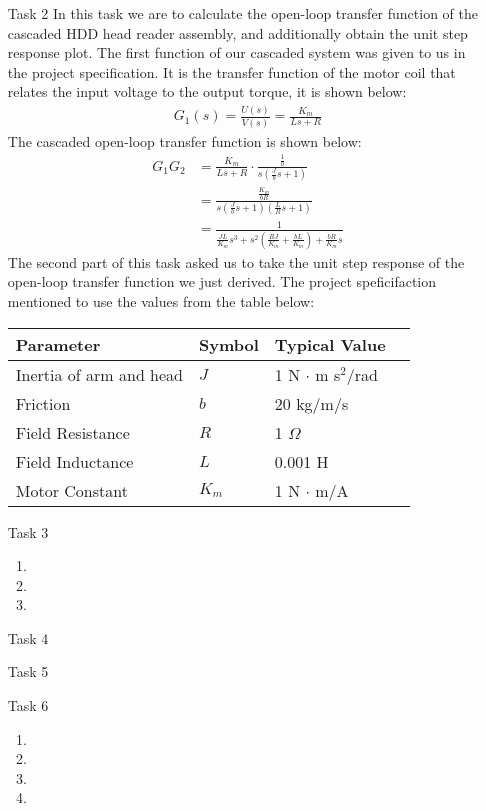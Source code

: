 \documentclass{article}
\begin{document}
\begin{itemize}
\item[Task 2]
	In this task we are to calculate the open-loop transfer function of the 
	cascaded HDD head reader assembly, and additionally obtain the unit step
	response plot. 
	The first function of our cascaded system was given to us in the project
	specification. It is the transfer function of the motor coil that relates
	the input voltage to the output torque, it is shown below: \\
	\begin{align*}
		G_1(s) = \frac{U(s)}{V(s)} = \frac{K_m}{Ls + R} 
	\end{align*}
	The cascaded open-loop transfer function is shown below:
	\begin{align*}
		G_1G_2 &= \frac{K_m}{Ls+R} \cdot \frac{\frac{1}{b}}{s(\frac{J}{b}s + 1)} \\
			   &= \frac{\frac{K_m}{bR}}{s\left(\frac{J}{b}s + 1\right)
			   \left(\frac{L}{R}s + 1\right)} \\
			   &= \frac{1}{\frac{JL}{K_m}s^3 + s^2\left( \frac{RJ}{K_m} + 
			   \frac{bL}{K_m} \right) + \frac{bR}{K_m}s}
	\end{align*}
	The second part of this task asked us to take the unit step response of the 
	open-loop transfer function we just derived. The project speficifaction 
	mentioned to use the values from the table below:\\
	\begin{center}
    \begin{tabular}{ | l | l | l | p{5cm} |}
    \hline
    Parameter & Symbol & Typical Value \\ \hline
    Inertia of arm and head & $J$ & 1 N $\cdot$ m s$^2$/rad \\ \hline 
    Friction & $b$ & 20 kg/m/s \\ \hline
    Field Resistance & $R$ & 1 $\Omega$ \\ \hline
	Field Inductance & $L$ & 0.001 H \\ \hline
	Motor Constant & $K_m$ & 1 N $\cdot$ m/A \\
    \hline
    \end{tabular}
	\end{center}

\item[Task 3]

  \begin{enumerate}[A]
  \item
  \item
  \item
  \end{enumerate}

\item[Task 4]
\item[Task 5]
\item[Task 6]

  \begin{enumerate}[A]
  \item
  \item
  \item
  \item
  \end{enumerate}

\end{itemize}
\end{document}
